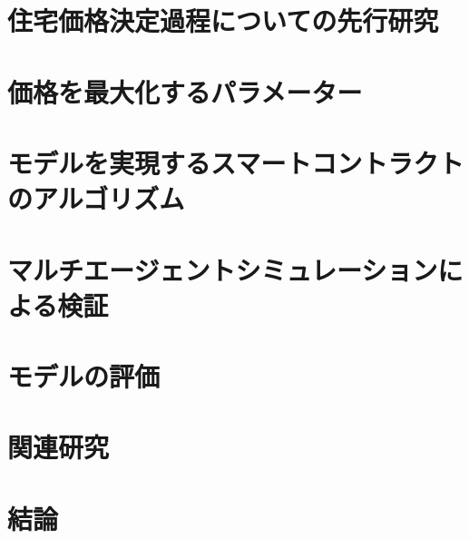 \documentclass[a4paper,10pt]{bxjsarticle}
\begin{document}
\section{住宅価格決定過程についての先行研究}
\section{価格を最大化するパラメーター}
\section{モデルを実現するスマートコントラクトのアルゴリズム}
\section{マルチエージェントシミュレーションによる検証}
\section{モデルの評価}
\section{関連研究}
\section{結論}



\end{document}
